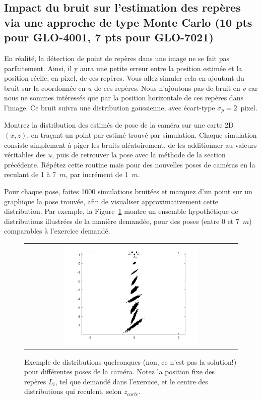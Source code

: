 \documentclass[12pt]{article}
\begin{document}
\subsection{Impact du bruit sur l'estimation des repères via une approche de type Monte Carlo (10 pts pour GLO-4001, 7 pts pour GLO-7021)}
\label{sec:ImpactBruit}
En réalité, la détection de point de repères dans une image ne se fait pas parfaitement. Ainsi, il y aura une petite erreur entre la position estimée et la position réelle, en pixel, de ces repères. Vous allez simuler cela en ajoutant du bruit sur la coordonnée en $u$ de ces repères. Nous n'ajoutons pas de bruit en $v$ car nous ne sommes intéressés que par la position horizontale de ces repères dans l'image. Ce bruit suivra une distribution gaussienne, avec écart-type $\sigma_p=2$~pixel.

Montrez la distribution des estimés de pose de la caméra sur une carte 2D $(x,z)$, en traçant un point par estimé trouvé par simulation. Chaque simulation consiste simplement à piger les bruits aléatoirement, de les additionner au valeurs véritables des $u$, puis de retrouver la pose avec la méthode de la section précédente. Répétez cette routine mais pour des nouvelles poses de caméras en la reculant de 1 à 7~$m$, par incrément de 1~$m$.

Pour chaque pose, faites 1000 simulations bruitées et marquez d'un point sur un graphique la pose trouvée, afin de visualiser approximativement cette distribution. Par exemple, la Figure~\ref{ExampleDistribution} montre un ensemble hypothétique de distributions illustrées de la manière demandée, pour des poses (entre 0 et 7~$m$) comparables à l'exercice demandé.

\begin{figure}[ht]
 \begin{center}
  \begin{tabular}{c}
    \includegraphics[width=0.65\textwidth]{ExampleDistribution.png} 
  \end{tabular}
 \end{center}
\vspace{-0.3in}
 \caption{Exemple de distributions quelconques (non, ce n'est pas la solution!) pour différentes poses de la caméra. Notez la position fixe des repères $L_i$, tel que demandé dans l'exercice, et le centre des distributions qui reculent, selon $z_{carte}$.}
 \label{ExampleDistribution}
\end{figure}
\end{document}
